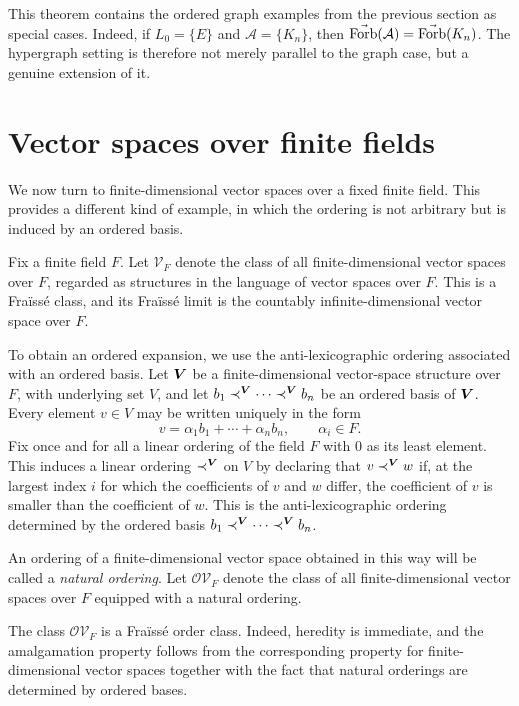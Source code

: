This theorem contains the ordered graph examples from the previous section as special cases. Indeed, if \(L_0=\{E\}\) and \(\mathcal A=\{K_n\}\), then \(\vec{\operatorname{Forb}}(\mathcal A)=\vec{\operatorname{Forb}}(K_n)\).
The hypergraph setting is therefore not merely parallel to the graph case, but a genuine extension of it.

\section{Vector spaces over finite fields}

We now turn to finite-dimensional vector spaces over a fixed finite field. This provides a different kind of example, in which the ordering is not arbitrary but is induced by an ordered basis.

Fix a finite field \(F\). Let \(\mathcal{V}_F\) denote the class of all finite-dimensional vector spaces over \(F\), regarded as structures in the language of vector spaces over \(F\). This is a Fraïssé class, and its Fraïssé limit is the countably infinite-dimensional vector space over \(F\).

To obtain an ordered expansion, we use the anti-lexicographic ordering associated with an ordered basis. Let \(\boldsymbol{V}\) be a finite-dimensional vector-space structure over \(F\), with underlying set \(V\), and let \(b_1\prec^{\boldsymbol{V}}\cdots\prec^{\boldsymbol{V}}b_n\) be an ordered basis of \(\boldsymbol{V}\). Every element \(v\in V\) may be written uniquely in the form
\[
    v=\alpha_1b_1+\cdots+\alpha_n b_n,
    \qquad
    \alpha_i\in F.
\]
Fix once and for all a linear ordering of the field \(F\) with \(0\) as its least element. This induces a linear ordering \(\prec^{\boldsymbol{V}}\) on \(V\) by declaring that \(v\prec^{\boldsymbol{V}}w\) if, at the largest index \(i\) for which the coefficients of \(v\) and \(w\) differ, the coefficient of \(v\) is smaller than the coefficient of \(w\). This is the anti-lexicographic ordering determined by the ordered basis \(b_1\prec^{\boldsymbol{V}}\cdots\prec^{\boldsymbol{V}}b_n\).

An ordering of a finite-dimensional vector space obtained in this way will be called a \emph{natural ordering}. Let \(\mathcal{OV}_F\) denote the class of all finite-dimensional vector spaces over \(F\) equipped with a natural ordering.

The class \(\mathcal{OV}_F\) is a Fraïssé order class. Indeed, heredity is immediate, and the amalgamation property follows from the corresponding property for finite-dimensional vector spaces together with the fact that natural orderings are determined by ordered bases.

